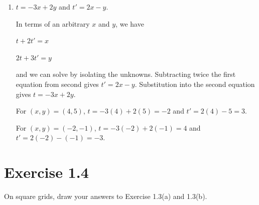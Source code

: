 \begin{solution}
\begin{enumerate}
       We have two equations of two unknowns,
       
       $t + 2t' = -2$
       
       $2t + 3t' = -1$
       
       and we can solve by isolating the unknowns. Subtracting 2 times the first equation from the second gives $t' = -3$; substituting into the first equation gives $t = 4$. We confirm that  $4\begin{bmatrix} 1 \\ 2 \end{bmatrix} - 3\begin{bmatrix} 2 \\ 3 \end{bmatrix}  = \begin{bmatrix} -2 \\ -1 \end{bmatrix}$.
  \item \begin{answer}
         $t = - 3x + 2y$ and $t' = 2x - y$.
       \end{answer}
       In terms of an arbitrary $x$ and $y$, we have
       
       $t + 2t' = x$
       
       $2t + 3t' = y$
       
       and we can solve by isolating the unknowns. Subtracting twice the first equation from second gives $t' = 2x - y$. Substitution into the second equation gives $t = - 3x + 2y$.
       
       For $(x, y) = (4, 5)$, $t = -3(4) + 2(5) = -2$ and $t' = 2(4) - 5 = 3$.
       
       For $(x, y) = (-2, -1)$, $t = -3(-2) + 2(-1) = 4$ and $t' = 2(-2) - (-1) = -3$.

\end{enumerate}
\end{solution}

\section*{Exercise 1.4}
\begin{exercise}
On square grids, draw your answers to Exercise 1.3(a) and 1.3(b).
\end{exercise}

\begin{solution}
\end{solution}

